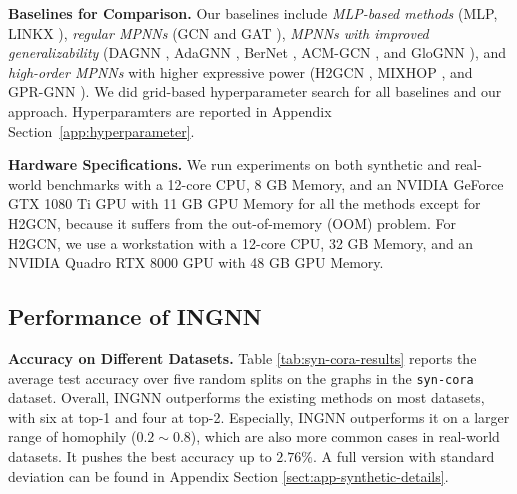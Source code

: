 \documentclass{article}
\theoremstyle{plain}
\newcommand{\pjn}{{INGNN}}
\begin{document}
\textbf{Baselines for Comparison.}
Our baselines include \textit{MLP-based methods} (MLP, LINKX \cite{lim2021large}), \textit{regular MPNNs} (GCN \cite{kipf2016semi} and GAT \cite{velivckovic2017graph}), \textit{MPNNs with improved generalizability} (DAGNN \cite{liu2020towards}, AdaGNN \cite{dong2021adagnn}, BerNet \cite{he2021bernnet}, ACM-GCN \cite{luan2022revisiting}, and GloGNN \cite{li2022finding}), and \textit{high-order MPNNs} with higher expressive power (H2GCN \cite{zhu2020beyond}, MIXHOP \cite{abu2019mixhop}, and GPR-GNN \cite{chien2020adaptive}). 
We did grid-based hyperparameter search for all baselines and our approach. Hyperparamters are reported in  Appendix Section~\ref{app:hyperparameter}. 

\textbf{Hardware Specifications.} We run experiments on both synthetic and real-world benchmarks with a 12-core CPU, 8 GB Memory, and an NVIDIA GeForce GTX 1080 Ti GPU with 11 GB GPU Memory for all the methods except for H2GCN, because it suffers from the out-of-memory (OOM) problem. For H2GCN, we use a workstation with a 12-core CPU, 32 GB Memory, and an NVIDIA Quadro RTX 8000 GPU with 48 GB GPU Memory.





\subsection{Performance of INGNN} \label{sec:Results}
\textbf{Accuracy on Different Datasets.}
Table \ref{tab:syn-cora-results} reports the average test accuracy over five random splits on the graphs in the \texttt{syn-cora} dataset. 
Overall, \pjn{} outperforms the existing methods on most datasets, with six at top-1 and four at top-2. Especially, \pjn{} outperforms it on a larger range of homophily ($0.2 \sim 0.8$), which are also more common cases in real-world datasets. It pushes the best accuracy up to $2.76\%$. A full version with standard deviation can be found in Appendix Section \ref{sect:app-synthetic-details}. 
\end{document}
